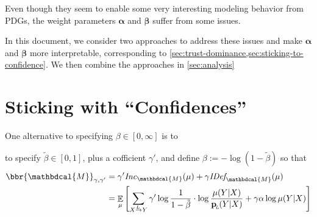 \documentclass[twoside]{article} %
\theoremstyle{plain}
\theoremstyle{definition}
\DeclareMathOperator*{\Ex}{\mathbb{E}} %
\newcommand{\mat}[1]{\mathbf{#1}}
\newcommand{\ssub}[1]{_{\!_{#1}\!}}
\newcommand{\bp}[1][L]{\mat{p}\ssub{#1}}
\newcommand{\balpha}{\boldsymbol\alpha}
\newcommand{\bbeta}{\boldsymbol\beta}
\newcommand{\dg}[1]{\mathbdcal{#1}}
\newcommand\Inc{\mathit{Inc}}
\newcommand{\IDef}[1]{\mathit{IDef}_{\!#1}}
\newcommand{\ed}[3]{#2%
    	  \overset{\smash{\mskip-5mu\raisebox{-1pt}{$\scriptscriptstyle
    	        #1$}}}{\rightarrow} #3}
\begin{document}
    Even though they seem to enable some very interesting modeling behavior from PDGs, the weight parameters $\balpha$ and $\bbeta$ suffer from some issues.



    In this document, we consider two approaches to address these issues and make $\balpha$ and $\bbeta$ more interpretable, corresponding to \cref{sec:trust-dominance,sec:sticking-to-confidence}. We then combine the approaches in \cref{sec:analysis}

    \section{Sticking with ``Confidences''} 
        \label{sec:sticking-to-confidence}
        
    One alternative to specifying $\beta \in [0, \infty]$ is to 

    to specify $\tilde\beta \in [0,1]$, plus a cofficient $\gamma'$, and define
    $
        \beta := - \log ({1-\tilde\beta})
    $
    so that
    \begin{align*}
        \bbr{\dg M}_{\gamma,\gamma'}
            &= \gamma' \Inc_{\dg M}(\mu) + \gamma \IDef{\dg M}(\mu) \\
            &= \Ex_{\mu} \left[
                \sum_{\ed LXY} \gamma' \log \frac1{1-\tilde\beta}\cdot\log \frac{\mu(Y|X)}{\bp(Y|X)}  + \gamma \alpha \log \mu(Y|X)
                \right]
    \end{align*}
\end{document}
